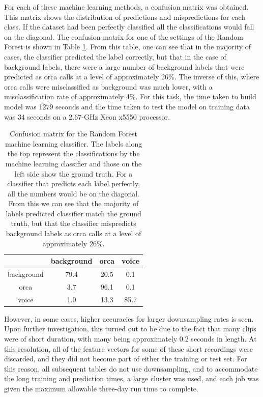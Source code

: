 For each of these machine learning methods, a confusion matrix was
obtained. This matrix shows the distribution of predictions and
mispredictions for each class. If the dataset had been perfectly
classified all the classifications would fall on the diagonal.  The
confusion matrix for one of the settings of the Random Forest is shown
in Table \ref{table:OBVConfusionMatrix}.  From this table, one can see
that in the majority of cases, the classifier predicted the label
correctly, but that in the case of background labels, there were a
large number of background labels that were predicted as orca calls at
a level of approximately 26\%.  The inverse of this, where orca calls
were misclassified as background was much lower, with a
misclassification rate of approximately 4\%.  For this task, the time
taken to build model was 1279 seconds and the time taken to test the
model on training data was 34 seconds on a 2.67-GHz Xeon x5550
processor.

\begin{table}
\begin{tabular}{|c|c|c|c|}
\hline
           & background & orca & voice \\
\hline
background & 79.4 &  20.5  &  0.1      \\
orca       & 3.7  &  96.1  &  0.1      \\
voice      & 1.0  &  13.3  &  85.7     \\
\hline
\end{tabular}
\caption{Confusion matrix for the Random Forest machine
  learning classifier.  The labels along the top represent the
  classifications by the machine learning classifier and those on the
  left side show the ground truth.  For a classifier that predicts
  each label perfectly, all the numbers would be on the diagonal. From
  this we can see that the majority of labels predicted classifier
  match the ground truth, but that the classifier mispredicts
  background labels as orca calls at a level of approximately 26\%.  }
\label{table:OBVConfusionMatrix}
\end{table}

However, in some cases, higher accuracies for larger downsampling
rates is seen.  Upon further investigation, this turned out to be due
to the fact that many clips were of short duration, with many being
approximately 0.2 seconds in length.  At this resolution, all of the
feature vectors for some of these short recordings were discarded, and
they did not become part of either the training or test set.  For this
reason, all subsequent tables do not use downsampling, and to
accommodate the long training and prediction times, a large cluster
was used, and each job was given the maximum allowable three-day run
time to complete.


